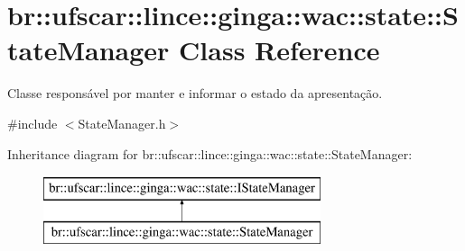 \hypertarget{classbr_1_1ufscar_1_1lince_1_1ginga_1_1wac_1_1state_1_1StateManager}{
\section{br::ufscar::lince::ginga::wac::state::StateManager Class Reference}
\label{classbr_1_1ufscar_1_1lince_1_1ginga_1_1wac_1_1state_1_1StateManager}
}


Classe responsável por manter e informar o estado da apresentação.  




{\ttfamily \#include $<$StateManager.h$>$}

Inheritance diagram for br::ufscar::lince::ginga::wac::state::StateManager:\begin{figure}[H]
\begin{center}
\leavevmode
\includegraphics[height=2cm]{classbr_1_1ufscar_1_1lince_1_1ginga_1_1wac_1_1state_1_1StateManager}
\end{center}
\end{figure}
